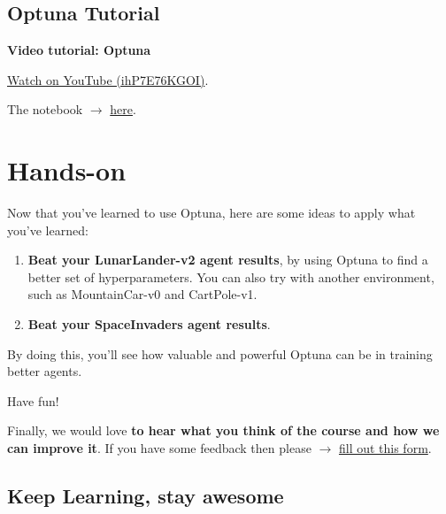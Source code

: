 \documentclass[11pt,a4paper]{article}
\begin{document}
\subsection{Optuna Tutorial}

\begin{coursenote}
  \textbf{Video tutorial: Optuna}\par
  \href{https://www.youtube.com/watch?v=ihP7E76KGOI}{Watch on YouTube (ihP7E76KGOI)}.
\end{coursenote}

The notebook $\rightarrow$ \href{https://colab.research.google.com/github/araffin/tools-for-robotic-rl-icra2022/blob/main/notebooks/optuna_lab.ipynb}{here}.

\section{Hands-on}\label{hands-on}

Now that you've learned to use Optuna, here are some ideas to apply what you've learned:

\begin{enumerate}[label=\textbf{\arabic*.},leftmargin=1.8em,itemsep=0.6em]
  \item \textbf{Beat your LunarLander-v2 agent results}, by using Optuna to find a better set of hyperparameters. You can also try with another environment, such as MountainCar-v0 and CartPole-v1.
  \item \textbf{Beat your SpaceInvaders agent results}.
\end{enumerate}

By doing this, you'll see how valuable and powerful Optuna can be in training better agents.

Have fun!

Finally, we would love \textbf{to hear what you think of the course and how we can improve it}. If you have some feedback then please $\rightarrow$ \href{https://forms.gle/BzKXWzLAGZESGNaE9}{fill out this form}.

\subsection*{Keep Learning, stay awesome}
\end{document}
